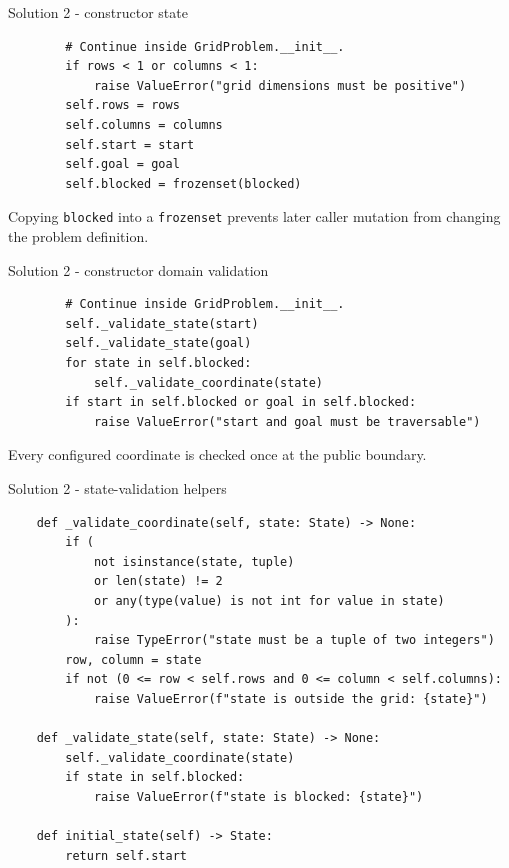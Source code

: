 \documentclass[aspectratio=169,11pt]{beamer}
\begin{document}
\begin{frame}[fragile]{Solution 2 - constructor state}
\begin{lstlisting}
        # Continue inside GridProblem.__init__.
        if rows < 1 or columns < 1:
            raise ValueError("grid dimensions must be positive")
        self.rows = rows
        self.columns = columns
        self.start = start
        self.goal = goal
        self.blocked = frozenset(blocked)
\end{lstlisting}
\answerlabel Copying \texttt{blocked} into a \texttt{frozenset} prevents later
caller mutation from changing the problem definition.
\end{frame}

\begin{frame}[fragile]{Solution 2 - constructor domain validation}
\begin{lstlisting}
        # Continue inside GridProblem.__init__.
        self._validate_state(start)
        self._validate_state(goal)
        for state in self.blocked:
            self._validate_coordinate(state)
        if start in self.blocked or goal in self.blocked:
            raise ValueError("start and goal must be traversable")
\end{lstlisting}
\answerlabel Every configured coordinate is checked once at the public boundary.
\end{frame}

\begin{frame}[fragile]{Solution 2 - state-validation helpers}
\begin{lstlisting}
    def _validate_coordinate(self, state: State) -> None:
        if (
            not isinstance(state, tuple)
            or len(state) != 2
            or any(type(value) is not int for value in state)
        ):
            raise TypeError("state must be a tuple of two integers")
        row, column = state
        if not (0 <= row < self.rows and 0 <= column < self.columns):
            raise ValueError(f"state is outside the grid: {state}")

    def _validate_state(self, state: State) -> None:
        self._validate_coordinate(state)
        if state in self.blocked:
            raise ValueError(f"state is blocked: {state}")

    def initial_state(self) -> State:
        return self.start
\end{lstlisting}
\end{frame}
\end{document}
